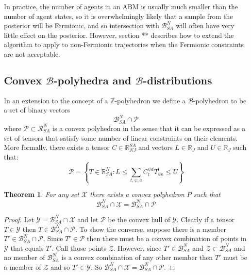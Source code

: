 \documentclass{article}
\newtheorem{theorem}{Theorem}
\begin{document}
In practice, the number of agents in an ABM is usually much smaller than the number of agent states, so it is overwhelmingly likely that a sample from the posterior will be Fermionic, and so intersection with $\mathcal{B}^N_{SA}$ will often have very little effect on the posterior. However, section ** describes how to extend the algorithm to apply to non-Fermionic trajectories when the Fermionic constraints are not acceptable.

\subsection{Convex $\mathcal{B}$-polyhedra and $\mathcal{B}$-distributions}
\label{BPoly}

In an extension to the concept of a $\mathbb{Z}$-polyhedron \cite{quinton1996manipulating} we define a $\mathcal{B}$-polyhedron to be a set of binary vectors
\[
\mathcal{B}^N_{SA} \cap \mathcal{P}
\]
where $\mathcal{P} \subset \mathcal{R}^N_{SA}$ is a convex polyhedron in the sense that it can be expressed as a set of tensors that satisfy some number of linear constraints on their elements. More formally, there exists a tensor $C \in \mathbb{R}^{SA}_{NJ}$ and vectors $L \in \mathbb{R}_J$ and $U \in \mathbb{R}_J$ such that:
\[
\mathcal{P} = \left\{ T\in\mathbb{R}^N_{SA} : L \le \sum_{t,\psi,a} C^{\psi a}_{t} T^t_{\psi a} \le U \right\}
\]

\begin{theorem}
For any set $\mathcal{X}$ there exists a convex polyhedron $P$ such that
\[
\mathcal{B}^N_{SA} \cap \mathcal{X} = \mathcal{B}^N_{SA} \cap \mathcal{P}
\]
\end{theorem}
\begin{proof}
Let $\mathcal{Y} = \mathcal{B}^N_{SA} \cap \mathcal{X}$ and let $\mathcal{P}$ be the convex hull of $\mathcal{Y}$. Clearly if a tensor $T\in \mathcal{Y}$ then $T\in \mathcal{B}^N_{SA} \cap \mathcal{P}$. To show the converse, suppose there is a member $T' \in \mathcal{B}^N_{SA} \cap \mathcal{P}$. Since $T'\in \mathcal{P}$ then there must be a convex combination of points in $\mathcal{Y}$ that equals $T'$. Call those points $\mathcal{Z}$. However, since $T' \in \mathcal{B}^N_{SA}$ and $\mathcal{Z}\subset \mathcal{B}^N_{SA}$ and no member of $\mathcal{B}^N_{SA}$ is a convex combination of any other member then $T'$ must be a member of $\mathcal{Z}$ and so $T'\in \mathcal{Y}$. So $\mathcal{B}^N_{SA} \cap \mathcal{X} = \mathcal{B}^N_{SA} \cap \mathcal{P}$. 
\end{proof}
\end{document}
